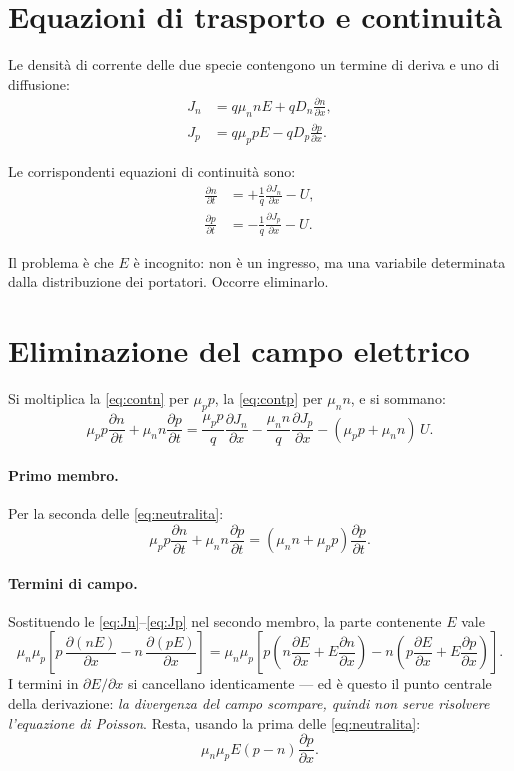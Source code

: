 \documentclass[11pt,a4paper]{article}
\newcommand{\dpar}[2]{\frac{\partial #1}{\partial #2}}
\begin{document}
\section{Equazioni di trasporto e continuit\`a}

Le densit\`a di corrente delle due specie contengono un termine di deriva e uno di
diffusione:
\begin{align}
  J_n &= q\mu_n n E + qD_n \dpar{n}{x}, \label{eq:Jn}\\
  J_p &= q\mu_p p E - qD_p \dpar{p}{x}. \label{eq:Jp}
\end{align}

Le corrispondenti equazioni di continuit\`a sono:
\begin{align}
  \dpar{n}{t} &= +\frac{1}{q}\dpar{J_n}{x} - U, \label{eq:contn}\\
  \dpar{p}{t} &= -\frac{1}{q}\dpar{J_p}{x} - U. \label{eq:contp}
\end{align}

Il problema \`e che $E$ \`e incognito: non \`e un ingresso, ma una variabile
determinata dalla distribuzione dei portatori. Occorre eliminarlo.

\section{Eliminazione del campo elettrico}

Si moltiplica la \eqref{eq:contn} per $\mu_p p$, la \eqref{eq:contp} per $\mu_n n$, e
si sommano:
\begin{equation}
  \mu_p p \dpar{n}{t} + \mu_n n \dpar{p}{t}
  = \frac{\mu_p p}{q}\dpar{J_n}{x} - \frac{\mu_n n}{q}\dpar{J_p}{x}
    - (\mu_p p + \mu_n n)\,U .
  \label{eq:combinata}
\end{equation}

\paragraph{Primo membro.} Per la seconda delle \eqref{eq:neutralita}:
\begin{equation}
  \mu_p p \dpar{n}{t} + \mu_n n \dpar{p}{t} = (\mu_n n + \mu_p p)\dpar{p}{t}.
\end{equation}

\paragraph{Termini di campo.} Sostituendo le \eqref{eq:Jn}--\eqref{eq:Jp} nel secondo
membro, la parte contenente $E$ vale
\begin{equation}
  \mu_n\mu_p \left[ p\,\dpar{(nE)}{x} - n\,\dpar{(pE)}{x} \right]
  = \mu_n\mu_p \left[ p\!\left(n\dpar{E}{x} + E\dpar{n}{x}\right)
                    - n\!\left(p\dpar{E}{x} + E\dpar{p}{x}\right) \right].
\end{equation}
I termini in $\partial E/\partial x$ si cancellano identicamente --- ed \`e questo il
punto centrale della derivazione: \emph{la divergenza del campo scompare, quindi non
serve risolvere l'equazione di Poisson}. Resta, usando la prima delle
\eqref{eq:neutralita}:
\begin{equation}
  \mu_n\mu_p E \left( p - n \right) \dpar{p}{x}.
\end{equation}
\end{document}
